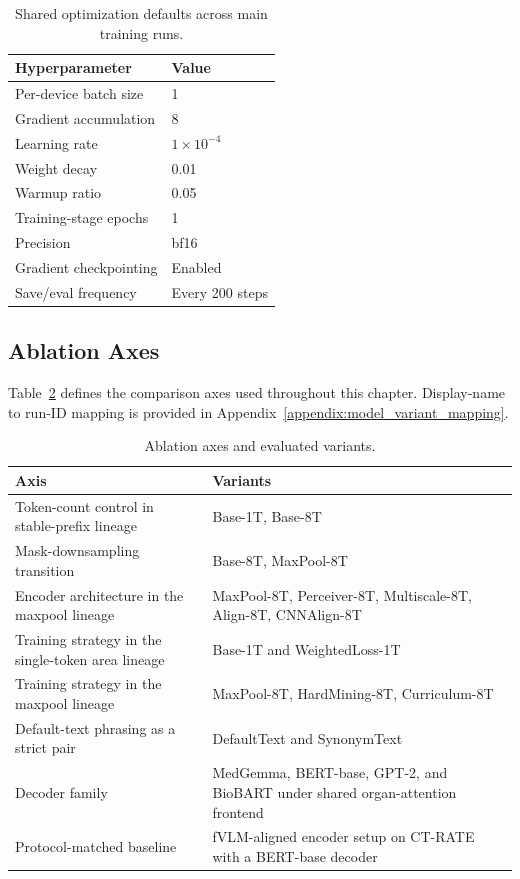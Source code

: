 \begin{table}[htbp]
    \centering
    \caption{Shared optimization defaults across main training runs.}
    \label{tab:training_defaults}
    \begin{tabular}{ll}
        \toprule
        \textbf{Hyperparameter} & \textbf{Value} \\\midrule
        Per-device batch size & 1 \\
        Gradient accumulation & 8 \\
        Learning rate & $1\times10^{-4}$ \\
        Weight decay & 0.01 \\
        Warmup ratio & 0.05 \\
        Training-stage epochs & 1 \\
        Precision & bf16 \\
        Gradient checkpointing & Enabled \\
        Save/eval frequency & Every 200 steps \\
        \bottomrule
    \end{tabular}
\end{table}

\subsection{Ablation Axes}
Table~\ref{tab:ablation_axes} defines the comparison axes used throughout this chapter. Display-name to run-ID mapping is provided in Appendix~\ref{appendix:model_variant_mapping}.

\begin{table}[htbp]
    \centering
    \caption{Ablation axes and evaluated variants.}
    \label{tab:ablation_axes}
    \begin{tabular}{p{3.0cm}p{10.6cm}}
        \toprule
        \textbf{Axis} & \textbf{Variants} \\\midrule
        Token-count control in stable-prefix lineage & Base-1T, Base-8T \\
        Mask-downsampling transition & Base-8T, MaxPool-8T \\
        Encoder architecture in the maxpool lineage & MaxPool-8T, Perceiver-8T, Multiscale-8T, Align-8T, CNNAlign-8T \\
        Training strategy in the single-token area lineage & Base-1T and WeightedLoss-1T \\
        Training strategy in the maxpool lineage & MaxPool-8T, HardMining-8T, Curriculum-8T \\
        Default-text phrasing as a strict pair & DefaultText and SynonymText \\
        Decoder family & MedGemma, BERT-base, GPT-2, and BioBART under shared organ-attention frontend \\
        Protocol-matched baseline & fVLM-aligned encoder setup on CT-RATE with a BERT-base decoder~\cite{shui2025fvlm} \\
        \bottomrule
    \end{tabular}
\end{table}

